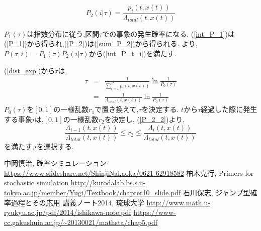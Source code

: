 \documentclass[12pt]{jsreport}
\begin{document}
\begin{equation}
P_2(i|\tau) = \frac{p_i(t,x(t))}{\Lambda_{total}(t,x(t))}
\end{equation}

$P_1(\tau)$は指数分布に従う,区間$\tau$での事象の発生確率になる.
(\ref{int_P_1})は(\ref{P_1})から得られ,(\ref{P_2})は(\ref{sum_P_2})から得られる.
より,$P(\tau,i)=P_1(\tau)P_2(i|\tau)$から(\ref{int_P_t_i})を満たす.

(\ref{dist_exp})から$\tau$は,
\begin{eqnarray}
 \tau & = & \frac{1}{\sum^{R}_{i=1} p_i(t,x(t))}\ln\frac{1}{P_0(\tau)} \\
      & = & \frac{1}{\Lambda_{total}(t,x(t))}\ln\frac{1}{P_0(\tau)}
\end{eqnarray}
$P_0(\tau)$を$[0,1]$の一様乱数$r_1$で置き換えて,$\tau$を決定する.
$t$から$\tau$経過した際に発生する事象$i$は,$[0,1]$の一様乱数$r_2$を決定し,
(\ref{P_2_2})より,
\begin{equation}
  \frac{\Lambda_{i-1}(t,x(t))}{\Lambda_{total}(t,x(t))} \leq r_2 \leq \frac{\Lambda_i(t,x(t))}{\Lambda_{total}(t,x(t))}
\end{equation}
を満たす,$i$を選択する.

\begin{thebibliography}{}
  中岡慎治, 確率シミュレーション \url{https://www.slideshare.net/ShinjiNakaoka/0621-62918582}
  柚木克行, Primers for stochastic simulation \url{http://kurodalab.bs.s.u-tokyo.ac.jp/member/Yugi/Textbook/chapter10_slide.pdf}
  石川保志, ジャンプ型確率過程とその応用 講義ノート2014, 琉球大学 \url{http://www.math.u-ryukyu.ac.jp/pdf/2014/ishikawa-note.pdf}
  \url{https://www-cc.gakushuin.ac.jp/~20130021/mathsta/chap5.pdf}
\end{thebibliography}
\end{document}
